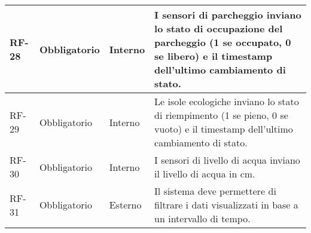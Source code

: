 \begin{longtable}{|>{\centering\arraybackslash}m{}|>{\centering\arraybackslash}m{}|>{\centering\arraybackslash}m{}|>{\centering\arraybackslash}m{}|}
	RF-28           & Obbligatorio        & Interno                                                                                                           & I sensori di parcheggio inviano lo stato di occupazione del parcheggio (1 se occupato, 0 se libero) e il timestamp dell'ultimo cambiamento di stato.                                                                                                                                                                                                                                                                                                                                                 \\\hline
	RF-29           & Obbligatorio        & Interno                                                                                                           & Le isole ecologiche inviano lo stato di riempimento (1 se pieno, 0 se vuoto) e il timestamp dell'ultimo cambiamento di stato.                                                                                                                                                                                                                                                                                                                                                                        \\\hline
	RF-30           & Obbligatorio        & Interno                                                                                                           & I sensori di livello di acqua inviano il livello di acqua in cm.                                                                                                                                                                                                                                                                                                                                                                                                                                     \\\hline
	RF-31           & Obbligatorio        & Esterno                                                                                                           & Il sistema deve permettere di filtrare i dati visualizzati in base a un intervallo di tempo.                                                                                                                                                                                                                                                                                                                                                                                                         \\\hline

\end{longtable}
